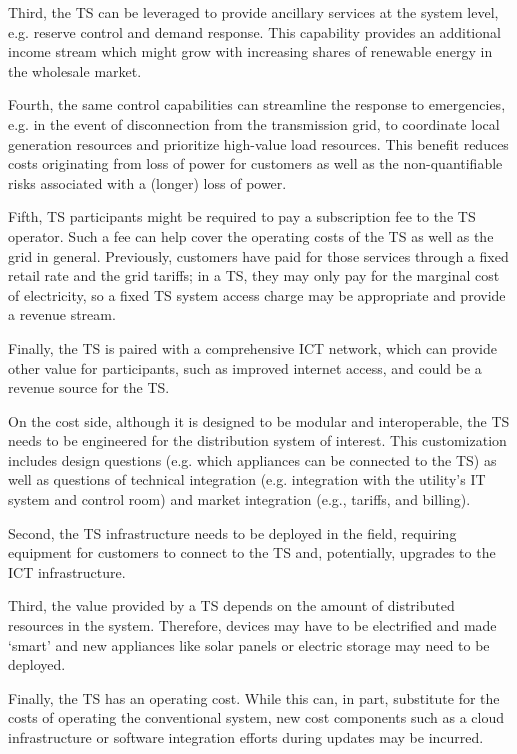 Third, the TS can be leveraged to provide ancillary services at the system level, e.g. reserve control and demand response. This capability provides an additional income stream which might grow with increasing shares of renewable energy in the wholesale market. 

Fourth, the same control capabilities can streamline the response to emergencies, e.g. in the event of disconnection from the transmission grid, to coordinate local generation resources and prioritize high-value load resources. This benefit reduces costs originating from loss of power for customers as well as the non-quantifiable risks associated with a (longer) loss of power. 

Fifth, TS participants might be required to pay a subscription fee to the TS operator. Such a fee can help cover the operating costs of the TS as well as the grid in general. Previously, customers have paid for those services through a fixed retail rate and the grid tariffs; in a TS, they may only pay for the marginal cost of electricity, so a fixed TS system access charge may be appropriate and provide a revenue stream. 

Finally, the TS is paired with a comprehensive ICT network, which can provide other value for participants, such as improved internet access, and could be a revenue source for the TS.
 
On the cost side, although it is designed to be modular and interoperable, the TS needs to be engineered for the distribution system of interest. This customization includes design questions (e.g. which appliances can be connected to the TS) as well as questions of technical integration (e.g. integration with the utility’s IT system and control room) and market integration (e.g., tariffs, and billing). 

Second, the TS infrastructure needs to be deployed in the field, requiring equipment for customers to connect to the TS and, potentially, upgrades to the ICT infrastructure. 

Third, the value provided by a TS depends on the amount of distributed resources in the system. Therefore, devices may have to be electrified and made `smart' and new appliances like solar panels or electric storage may need to be deployed. 

Finally, the TS has an operating cost. While this can, in part, substitute for the costs of operating the conventional system, new cost components such as a cloud infrastructure or software integration efforts during updates may be incurred. 


